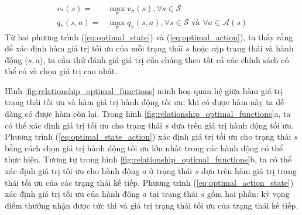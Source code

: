 \begin{align}
v_{*}(s) = {} & \max_{\pi}v_{\pi}(s), \forall s \in \mathcal{S} \label{eq:optimal_state} \\
q_{*}(s,a) = {} & \max_{\pi}q_{\pi}(s,a), \forall s \in \mathcal{S} \text{ và } \forall a \in \mathcal{A}(s) \label{eq:optimal_action}
\end{align}
Từ hai phương trình (\ref{eq:optimal_state}) và (\ref{eq:optimal_action}), ta thấy rằng để xác định hàm giá trị tối ưu của mỗi trạng thái $s$ hoặc cặp trạng thái và hành động ($s,a$), ta cần thử đánh giá giá trị của chúng theo tất cả các chính sách có thể có và chọn giá trị cao nhất.

Hình \ref{fig:relationship_optimal_functions} minh hoạ quan hệ giữa hàm giá trị trạng thái tối ưu và hàm giá trị hành động tối ưu; khi có được hàm này ta dễ dàng có được hàm còn lại. 
Trong hình \ref{fig:relationship_optimal_functions}a, ta có thể xác định giá trị tối ưu cho trạng thái $s$ dựa trên giá trị hành động tối ưu. 
Phương trình (\ref{eq:optimal_state_action}) xác định giá trị tối ưu cho trạng thái $s$ bằng cách chọn giá trị hành động tối ưu lớn nhất trong các hành động có thể thực hiện. 
Tương tự trong hình \ref{fig:relationship_optimal_functions}b, ta có thể xác định giá trị tối ưu cho hành động $a$ ở trạng thái $s$ dựa trên hàm giá trị trạng thái tối ưu của các trạng thái kế tiếp. 
Phương trình (\ref{eq:optimal_action_state}) xác định giá trị tối ưu của hành động $a$ tại trạng thái $s$ gồm hai phần: kỳ vọng điểm thưởng nhận được tức thì và giá trị trạng thái tối ưu của trạng thái kế tiếp.

